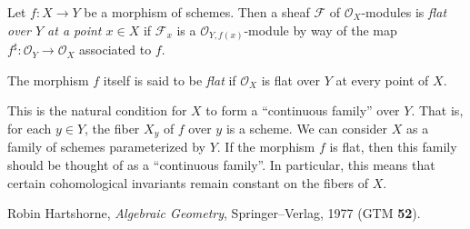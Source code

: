 \documentclass[12pt]{article}
\begin{document}
Let $f\colon X\to Y$ be a morphism of schemes.  Then a sheaf $\mathcal{F}$ of $\mathcal{O}_X$-modules is \emph{flat over $Y$ at a point $x\in X$} if $\mathcal{F}_x$ is a  $\mathcal{O}_{Y,f(x)}$-module by way of the map $f^\sharp\colon \mathcal{O}_Y\to\mathcal{O}_X$ associated to $f$.

The morphism $f$ itself is said to be \emph{flat} if $\mathcal{O}_X$ is flat over $Y$ at every point of $X$.

This is the natural condition for $X$ to form a ``continuous family'' over $Y$.  That is, for each $y\in Y$, the fiber $X_y$ of $f$ over $y$ is a scheme.  We can consider $X$ as a family of schemes parameterized by $Y$.  If the morphism $f$ is flat, then this family should be thought of as a ``continuous family''.  In particular, this means that certain cohomological invariants remain constant on the fibers of $X$. 

\begin{thebibliography}{9}
 Robin Hartshorne, {\em Algebraic
Geometry}, Springer--Verlag, 1977 (GTM {\bf 52}).
\end{thebibliography}
\end{document}
